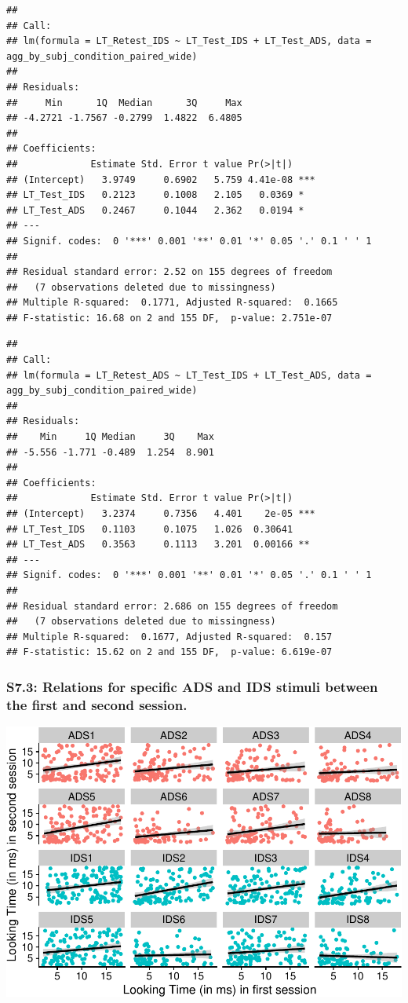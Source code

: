 \documentclass[
  man, donotrepeattitle,floatsintext]{apa6}
\begin{document}
\begin{verbatim}
## 
## Call:
## lm(formula = LT_Retest_IDS ~ LT_Test_IDS + LT_Test_ADS, data = agg_by_subj_condition_paired_wide)
## 
## Residuals:
##     Min      1Q  Median      3Q     Max 
## -4.2721 -1.7567 -0.2799  1.4822  6.4805 
## 
## Coefficients:
##             Estimate Std. Error t value Pr(>|t|)    
## (Intercept)   3.9749     0.6902   5.759 4.41e-08 ***
## LT_Test_IDS   0.2123     0.1008   2.105   0.0369 *  
## LT_Test_ADS   0.2467     0.1044   2.362   0.0194 *  
## ---
## Signif. codes:  0 '***' 0.001 '**' 0.01 '*' 0.05 '.' 0.1 ' ' 1
## 
## Residual standard error: 2.52 on 155 degrees of freedom
##   (7 observations deleted due to missingness)
## Multiple R-squared:  0.1771, Adjusted R-squared:  0.1665 
## F-statistic: 16.68 on 2 and 155 DF,  p-value: 2.751e-07
\end{verbatim}

\begin{verbatim}
## 
## Call:
## lm(formula = LT_Retest_ADS ~ LT_Test_IDS + LT_Test_ADS, data = agg_by_subj_condition_paired_wide)
## 
## Residuals:
##    Min     1Q Median     3Q    Max 
## -5.556 -1.771 -0.489  1.254  8.901 
## 
## Coefficients:
##             Estimate Std. Error t value Pr(>|t|)    
## (Intercept)   3.2374     0.7356   4.401    2e-05 ***
## LT_Test_IDS   0.1103     0.1075   1.026  0.30641    
## LT_Test_ADS   0.3563     0.1113   3.201  0.00166 ** 
## ---
## Signif. codes:  0 '***' 0.001 '**' 0.01 '*' 0.05 '.' 0.1 ' ' 1
## 
## Residual standard error: 2.686 on 155 degrees of freedom
##   (7 observations deleted due to missingness)
## Multiple R-squared:  0.1677, Adjusted R-squared:  0.157 
## F-statistic: 15.62 on 2 and 155 DF,  p-value: 6.619e-07
\end{verbatim}

\hypertarget{s7.3-relations-for-specific-ads-and-ids-stimuli-between-the-first-and-second-session.}{%
\subsubsection{S7.3: Relations for specific ADS and IDS stimuli between the first and second session.}\label{s7.3-relations-for-specific-ads-and-ids-stimuli-between-the-first-and-second-session.}}

\includegraphics{MB1T_supplement_files/figure-latex/unnamed-chunk-11-1.pdf}
\end{document}
